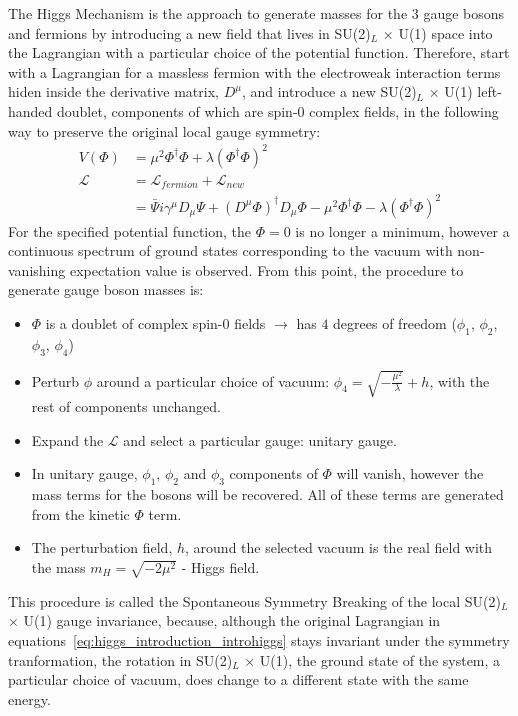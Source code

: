 The Higgs Mechanism is the approach to generate masses for the 3 gauge bosons and fermions by introducing a new field that lives in SU(2)$_L$ $\times$ U(1) space into the Lagrangian with a particular choice of the potential function. Therefore, start with a Lagrangian for a massless fermion with the electroweak interaction terms hiden inside the derivative matrix, $D^{\mu}$, and introduce a new SU(2)$_L$ $\times$ U(1) left-handed doublet, components of which are spin-0 complex fields, in the following way to preserve the original local gauge symmetry:
\begin{subequations}\label{eq:higgs_introduction_introhiggs}
\begin{align}
    V(\Phi)& = \mu^2\Phi^{\dagger}\Phi + \lambda(\Phi^{\dagger}\Phi)^2\\
    \mathcal{L}& = \mathcal{L}_{fermion} + \mathcal{L}_{new}\\
    & = \bar{\Psi}i\gamma^{\mu}D_{\mu}\Psi + (D^{\mu}\Phi)^{\dagger}D_{\mu}\Phi - \mu^2\Phi^{\dagger}\Phi - \lambda(\Phi^{\dagger}\Phi)^2
\end{align}
\end{subequations}
For the specified potential function, the $\Phi = 0$ is no longer a minimum, however a continuous spectrum of ground states corresponding to the vacuum with non-vanishing expectation value is observed. From this point, the procedure to generate gauge boson masses is:
\begin{itemize}
    \item $\Phi$ is a doublet of complex spin-0 fields $\rightarrow$ has $4$ degrees of freedom ($\phi_1$, $\phi_2$, $\phi_3$, $\phi_4$)
    \item Perturb $\phi$ around a particular choice of vacuum: $\phi_4 = \sqrt{-\frac{\mu^2}{\lambda}} + h$, with the rest of components unchanged.
    \item Expand the $\mathcal{L}$ and select a particular gauge: unitary gauge.
    \item In unitary gauge, $\phi_1$, $\phi_2$ and $\phi_3$ components of $\Phi$ will vanish, however the mass terms for the bosons will be recovered. All of these terms are generated from the kinetic $\Phi$ term.
    \item The perturbation field, $h$, around the selected vacuum is the real field with the mass $m_H = \sqrt{-2\mu^2}$ - Higgs field.
\end{itemize}
This procedure is called the Spontaneous Symmetry Breaking of the local SU(2)$_L$ $\times$ U(1) gauge invariance, because, although the original Lagrangian in equations~\ref{eq:higgs_introduction_introhiggs} stays invariant under the symmetry tranformation, the rotation in SU(2)$_L$ $\times$ U(1), the ground state of the system, a particular choice of vacuum, does change to a different state with the same energy.

